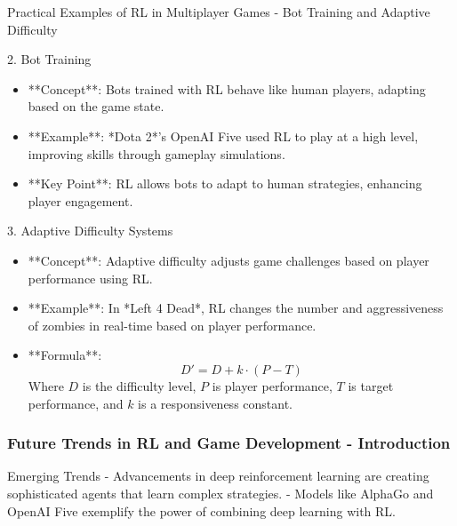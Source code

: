 \documentclass[aspectratio=169]{beamer}
\begin{document}
\begin{frame}[fragile]{Practical Examples of RL in Multiplayer Games - Bot Training and Adaptive Difficulty}
    \begin{block}{2. Bot Training}
        \begin{itemize}
            \item **Concept**: Bots trained with RL behave like human players, adapting based on the game state.
            \item **Example**: *Dota 2*'s OpenAI Five used RL to play at a high level, improving skills through gameplay simulations.
            \item **Key Point**: RL allows bots to adapt to human strategies, enhancing player engagement.
        \end{itemize}
    \end{block}
    
    \begin{block}{3. Adaptive Difficulty Systems}
        \begin{itemize}
            \item **Concept**: Adaptive difficulty adjusts game challenges based on player performance using RL.
            \item **Example**: In *Left 4 Dead*, RL changes the number and aggressiveness of zombies in real-time based on player performance.
            \item **Formula**: 
                \[
                D' = D + k \cdot (P - T)
                \]
                Where \(D\) is the difficulty level, \(P\) is player performance, \(T\) is target performance, and \(k\) is a responsiveness constant.
        \end{itemize}
    \end{block}
\end{frame}

\begin{frame}[fragile]
    \frametitle{Future Trends in RL and Game Development - Introduction}
    \begin{block}{Emerging Trends}
        - Advancements in deep reinforcement learning are creating sophisticated agents that learn complex strategies.
        - Models like AlphaGo and OpenAI Five exemplify the power of combining deep learning with RL.
    \end{block}
\end{frame}
\end{document}
